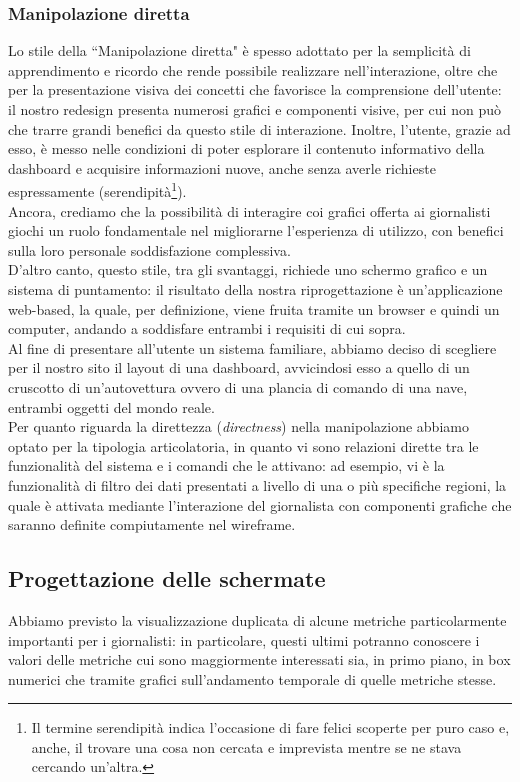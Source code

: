 \subsubsection{Manipolazione diretta}
\label{sss:manipolazione-diretta}
Lo stile della ``Manipolazione diretta" è spesso adottato per la semplicità di apprendimento e ricordo che rende possibile realizzare nell'interazione, oltre che per la presentazione visiva dei concetti che favorisce la comprensione dell'utente: il nostro redesign presenta numerosi grafici e componenti visive, per cui non può che trarre grandi benefici da questo stile di interazione. Inoltre, l'utente, grazie ad esso, è messo nelle condizioni di poter esplorare il contenuto informativo della dashboard e acquisire informazioni nuove, anche senza averle richieste espressamente (serendipità\footnote{Il termine serendipità indica l'occasione di fare felici scoperte per puro caso e, anche, il trovare una cosa non cercata e imprevista mentre se ne stava cercando un'altra.}).\\
Ancora, crediamo che la possibilità di interagire coi grafici offerta ai giornalisti giochi un ruolo fondamentale nel migliorarne l'esperienza di utilizzo, con benefici sulla loro personale soddisfazione complessiva.\\
D'altro canto, questo stile, tra gli svantaggi, richiede uno schermo grafico e un sistema di puntamento: il risultato della nostra riprogettazione è un'applicazione web-based, la quale, per definizione, viene fruita tramite un browser e quindi un computer, andando a soddisfare entrambi i requisiti di cui sopra.\\
Al fine di presentare all'utente un sistema familiare, abbiamo deciso di scegliere per il nostro sito il layout di una dashboard, avvicindosi esso a quello di un cruscotto di un'autovettura ovvero di una plancia di comando di una nave, entrambi oggetti del mondo reale.\\
Per quanto riguarda la direttezza (\textit{directness}) nella manipolazione abbiamo optato per la tipologia articolatoria, in quanto vi sono relazioni dirette tra le funzionalità del sistema e i comandi che le attivano: ad esempio, vi è la funzionalità di filtro dei dati presentati a livello di una o più specifiche regioni, la quale è attivata mediante l'interazione del giornalista con componenti grafiche che saranno definite compiutamente nel wireframe.

\subsection{Progettazione delle schermate}
\label{ss:progettazione-schermate}
Abbiamo previsto la visualizzazione duplicata di alcune metriche particolarmente importanti per i giornalisti: in particolare, questi ultimi potranno conoscere i valori delle metriche cui sono maggiormente interessati sia, in primo piano, in box numerici che tramite grafici sull'andamento temporale di quelle metriche stesse.

